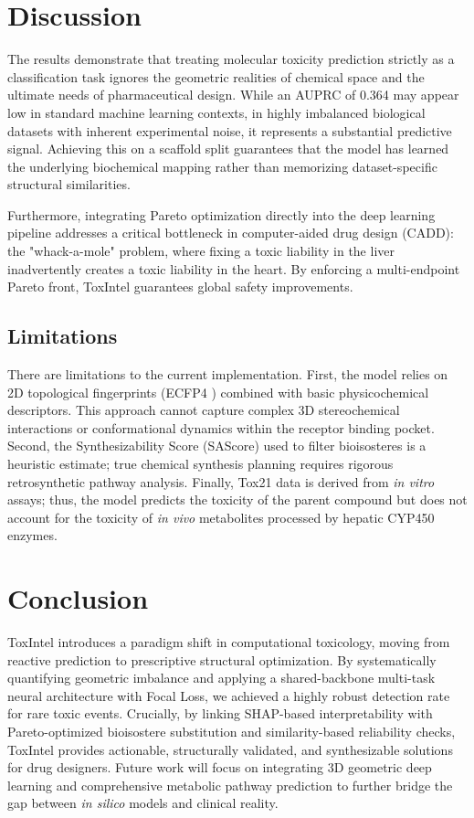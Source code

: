 \documentclass[lettersize,journal]{IEEEtran}
\begin{document}
\section{Discussion}
The results demonstrate that treating molecular toxicity prediction strictly as a classification task ignores the geometric realities of chemical space and the ultimate needs of pharmaceutical design. While an AUPRC of 0.364 may appear low in standard machine learning contexts, in highly imbalanced biological datasets with inherent experimental noise, it represents a substantial predictive signal. Achieving this on a scaffold split guarantees that the model has learned the underlying biochemical mapping rather than memorizing dataset-specific structural similarities.

Furthermore, integrating Pareto optimization directly into the deep learning pipeline addresses a critical bottleneck in computer-aided drug design (CADD): the "whack-a-mole" problem, where fixing a toxic liability in the liver inadvertently creates a toxic liability in the heart. By enforcing a multi-endpoint Pareto front, ToxIntel guarantees global safety improvements. 

\subsection{Limitations}
There are limitations to the current implementation. First, the model relies on 2D topological fingerprints (ECFP4 \cite{ref5}) combined with basic physicochemical descriptors. This approach cannot capture complex 3D stereochemical interactions or conformational dynamics within the receptor binding pocket. Second, the Synthesizability Score (SAScore) used to filter bioisosteres is a heuristic estimate; true chemical synthesis planning requires rigorous retrosynthetic pathway analysis. Finally, Tox21 data is derived from \textit{in vitro} assays; thus, the model predicts the toxicity of the parent compound but does not account for the toxicity of \textit{in vivo} metabolites processed by hepatic CYP450 enzymes.

\section{Conclusion}
ToxIntel introduces a paradigm shift in computational toxicology, moving from reactive prediction to prescriptive structural optimization. By systematically quantifying geometric imbalance and applying a shared-backbone multi-task neural architecture with Focal Loss, we achieved a highly robust detection rate for rare toxic events. Crucially, by linking SHAP-based interpretability with Pareto-optimized bioisostere substitution and similarity-based reliability checks, ToxIntel provides actionable, structurally validated, and synthesizable solutions for drug designers. Future work will focus on integrating 3D geometric deep learning and comprehensive metabolic pathway prediction to further bridge the gap between \textit{in silico} models and clinical reality.
\end{document}
